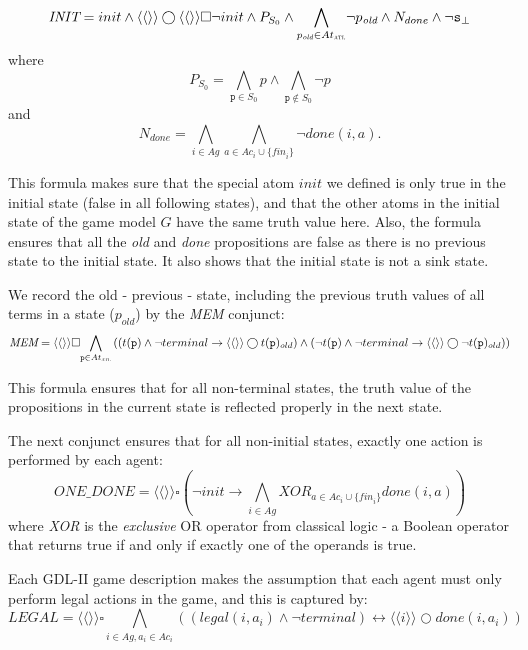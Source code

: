 \documentclass{article}
\theoremstyle{theorem}
\theoremstyle{lemma}
\theoremstyle{definition}
\theoremstyle{remark}
\begin{document}
\[
    \textit{INIT} = init \wedge \langle \langle \rangle \rangle \bigcirc \langle \langle \rangle \rangle \square \neg init \wedge P_{S_{0}} \wedge \underset{p_\textit{old} \in At_\textsc{atl}}{\bigwedge} \neg p_\textit{old} \wedge N_{done} \wedge \neg \texttt{s}_\bot
\]
where
\[
    P_{S_{0}} = \underset{\texttt{p} \in S_0}{\bigwedge} p \wedge \underset{\texttt{p} \not \in S_0}{\bigwedge} \neg p
\]
and
\[
    N_{done} = \underset{i \in Ag}{\bigwedge} \underset{a \in Ac_i \cup \{\textit{fin}_i\}}{\bigwedge} \neg done(i,a).
\]
\par This formula makes sure that the special atom $init$ we defined is only true in the initial state (false in all following states), and that the other atoms in the initial state of the game model $G$ have the same truth value here. Also, the formula ensures that all the \textit{old} and \textit{done} propositions are false as there is no previous state to the initial state. It also shows that the initial state is not a sink state.
\par We record the old - previous - state, including the previous truth values of all terms in a state ($p_{old}$) by the \textit{MEM} conjunct:
\[
    \textit{MEM} = \langle \langle \rangle \rangle \square \underset{\texttt{p} \in At_\textsc{atl}}{\bigwedge} \left( (t(\texttt{p}) \wedge \neg terminal \rightarrow \langle \langle \rangle \rangle \bigcirc t(\texttt{p})_{old}) \wedge (\neg t(\texttt{p}) \wedge \neg terminal \rightarrow \langle \langle \rangle \rangle \bigcirc \neg t(\texttt{p})_{old}) \right)
\]
\par This formula ensures that for all non-terminal states, the truth value of the propositions in the current state is reflected properly in the next state.
\par The next conjunct ensures that for all non-initial states, exactly one action is performed by each agent:
\[
    \textit{ONE\_DONE} = \langle \langle \rangle \rangle \square (\neg init \rightarrow \underset{i \in Ag}{\bigwedge} \textit{XOR}_{a \in Ac_i \cup \{\textit{fin}_i\}} done(i,a))
\]
where \textit{XOR} is the \textit{exclusive} OR operator from classical logic - a Boolean operator that returns true if and only if exactly one of the operands is true.
\par Each GDL-II game description makes the assumption that each agent must only perform legal actions in the game, and this is captured by:
\[
    \textit{LEGAL} = \langle \langle \rangle \rangle \square \underset{i \in Ag, a_i \in Ac_i}{\bigwedge} \left( (legal(i,a_i) \wedge \neg terminal) \leftrightarrow \langle \langle i \rangle \rangle \bigcirc done(i,a_i)\right)
\]
\end{document}
